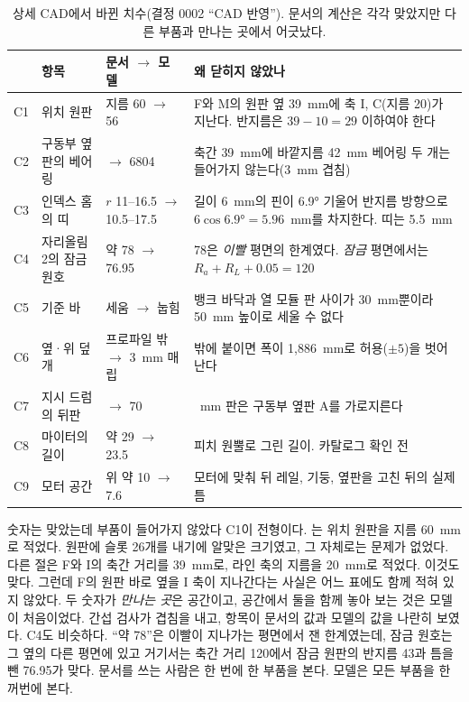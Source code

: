 \begin{table}[ht]
\centering
\caption{상세 CAD에서 바뀐 치수(결정 0002 ``CAD 반영''). 문서의 계산은 각각 맞았지만 다른 부품과 만나는 곳에서 어긋났다.}
\label{tab:gc-found}
\small
\begin{tabularx}{\linewidth}{>{\raggedright\arraybackslash}p{8mm}>{\raggedright\arraybackslash}p{30mm}>{\raggedright\arraybackslash}p{30mm}>{\raggedright\arraybackslash}X}
\toprule
& 항목 & 문서 $\to$ 모델 & 왜 닫히지 않았나 \\
\midrule
C1 & 위치 원판 & 지름 60 $\to$ 56 & F와 M의 원판 옆 39~mm에 축 I, C(지름 20)가 지난다. 반지름은 $39 - 10 = 29$ 이하여야 한다 \\
C2 & 구동부 옆판의 베어링 & 6004 $\to$ 6804 & 축간 39~mm에 바깥지름 42~mm 베어링 두 개는 들어가지 않는다(3~mm 겹침) \\
C3 & 인덱스 홈의 띠 & $r$ 11--16.5 $\to$ 10.5--17.5 & 길이 6~mm의 핀이 6.9° 기울어 반지름 방향으로 $6 \cos 6.9° = 5.96$~mm를 차지한다. 띠는 5.5~mm \\
C4 & 자리올림 2의 잠금 원호 & 약 78 $\to$ 76.95 & 78은 \emph{이빨} 평면의 한계였다. \emph{잠금} 평면에서는 $R_a + R_L + 0.05 = 120$ \\
C5 & 기준 바 & 세움 $\to$ 눕힘 & 뱅크 바닥과 열 모듈 판 사이가 30~mm뿐이라 50~mm 높이로 세울 수 없다 \\
C6 & 옆·위 덮개 & 프로파일 밖 $\to$ 3~mm 매립 & 밖에 붙이면 폭이 1,886~mm로 허용($\pm5$)을 벗어난다 \\
C7 & 지시 드럼의 뒤판 & 116 $\to$ 70 & 116~mm 판은 구동부 옆판 A를 가로지른다 \\
C8 & 마이터의 길이 & 약 29 $\to$ 23.5 & 피치 원뿔로 그린 길이. 카탈로그 확인 전 \\
C9 & 모터 공간 & 위 약 10 $\to$ 7.6 & 모터에 맞춰 뒤 레일, 기둥, 옆판을 고친 뒤의 실제 틈 \\
\bottomrule
\end{tabularx}
\end{table}

\begin{lesson}{숫자는 맞았는데 부품이 들어가지 않았다}
C1이 전형이다. 는 위치 원판을 지름 60~mm로 적었다. 원판에 슬롯 26개를 내기에 알맞은 크기였고, 그 자체로는
문제가 없었다. 다른 절은 F와 I의 축간 거리를 39~mm로, 라인 축의 지름을 20~mm로 적었다. 이것도 맞다. 그런데 F의 원판
바로 옆을 I 축이 지나간다는 사실은 어느 표에도 함께 적혀 있지 않았다. 두 숫자가 \emph{만나는 곳}은 공간이고, 공간에서
둘을 함께 놓아 보는 것은 모델이 처음이었다. 간섭 검사가 겹침을 내고,  항목이 문서의 값과 모델의 값을 나란히
보였다. C4도 비슷하다. ``약 78''은 이빨이 지나가는 평면에서 잰 한계였는데, 잠금 원호는 그 옆의 다른 평면에 있고 거기서는
축간 거리 120에서 잠금 원판의 반지름 43과 틈을 뺀 76.95가 맞다. 문서를 쓰는 사람은 한 번에 한 부품을 본다. 모델은 모든
부품을 한꺼번에 본다.
\end{lesson}

